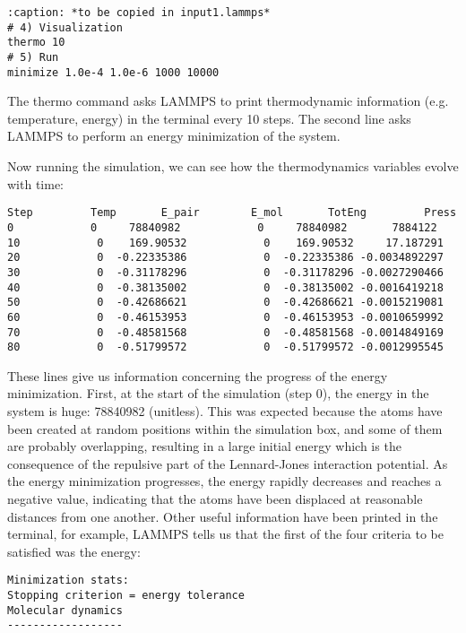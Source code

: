 \begin{verbatim}
:caption: *to be copied in input1.lammps*
# 4) Visualization
thermo 10
# 5) Run
minimize 1.0e-4 1.0e-6 1000 10000
\end{verbatim}

\noindent The thermo command asks LAMMPS to print
thermodynamic information (e.g. temperature, energy) in the
terminal every 10 steps. The second line asks LAMMPS to
perform an energy minimization of the system.

Now running the simulation, we can see how the thermodynamics
variables evolve with time:

\begin{verbatim}
Step         Temp       E_pair        E_mol       TotEng         Press
0            0     78840982            0     78840982       7884122 
10            0    169.90532            0    169.90532     17.187291 
20            0  -0.22335386            0  -0.22335386 -0.0034892297 
30            0  -0.31178296            0  -0.31178296 -0.0027290466 
40            0  -0.38135002            0  -0.38135002 -0.0016419218 
50            0  -0.42686621            0  -0.42686621 -0.0015219081 
60            0  -0.46153953            0  -0.46153953 -0.0010659992 
70            0  -0.48581568            0  -0.48581568 -0.0014849169 
80            0  -0.51799572            0  -0.51799572 -0.0012995545 
\end{verbatim}

\noindent These lines give us information concerning
the progress of the energy minimization. First, at the start
of the simulation (step 0), the energy in the system is
huge: 78840982 (unitless). This was expected because
the atoms have been created at random positions within the
simulation box, and some of them are probably overlapping,
resulting in a large initial energy which is the consequence
of the repulsive part of the Lennard-Jones interaction
potential. As the energy minimization progresses, the energy
rapidly decreases and reaches a negative value, indicating that the atoms have been
displaced at reasonable distances from one another. Other
useful information have been printed in the terminal, for
example, LAMMPS tells us that the first of the four criteria
to be satisfied was the energy:

\begin{verbatim}
Minimization stats:
Stopping criterion = energy tolerance
Molecular dynamics
------------------
\end{verbatim}

